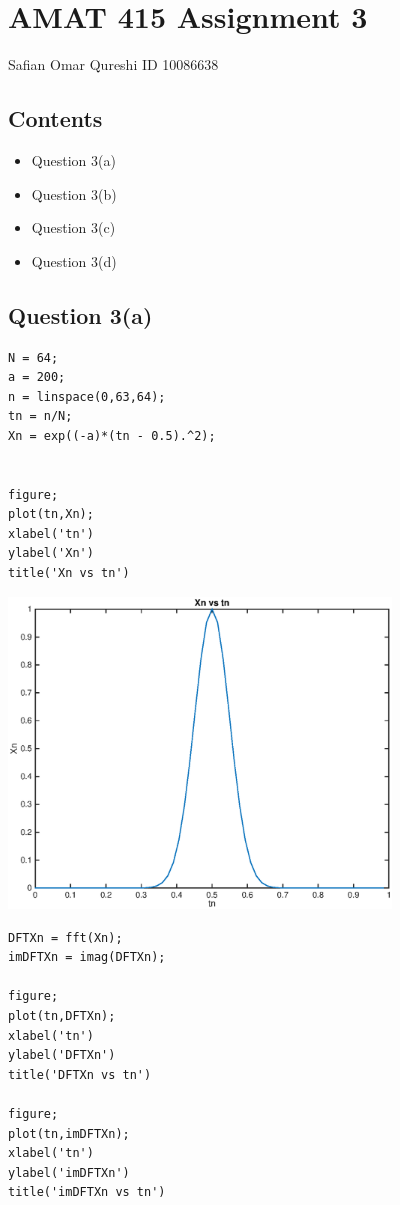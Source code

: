 \documentclass{article}
\begin{document}
    
    
\section*{AMAT 415 Assignment 3}

\begin{par}
Safian Omar Qureshi ID 10086638
\end{par} \vspace{1em}

\subsection*{Contents}

\begin{itemize}
\setlength{\itemsep}{-1ex}
   \item Question 3(a)
   \item Question 3(b)
   \item Question 3(c)
   \item Question 3(d)
\end{itemize}


\subsection*{Question 3(a)}

\begin{verbatim}
N = 64;
a = 200;
n = linspace(0,63,64);
tn = n/N;
Xn = exp((-a)*(tn - 0.5).^2);


figure;
plot(tn,Xn);
xlabel('tn')
ylabel('Xn')
title('Xn vs tn')
\end{verbatim}

\includegraphics [width=4in]{untitled_01.eps}
\begin{verbatim}
DFTXn = fft(Xn);
imDFTXn = imag(DFTXn);

figure;
plot(tn,DFTXn);
xlabel('tn')
ylabel('DFTXn')
title('DFTXn vs tn')

figure;
plot(tn,imDFTXn);
xlabel('tn')
ylabel('imDFTXn')
title('imDFTXn vs tn')
\end{verbatim}
\end{document}
